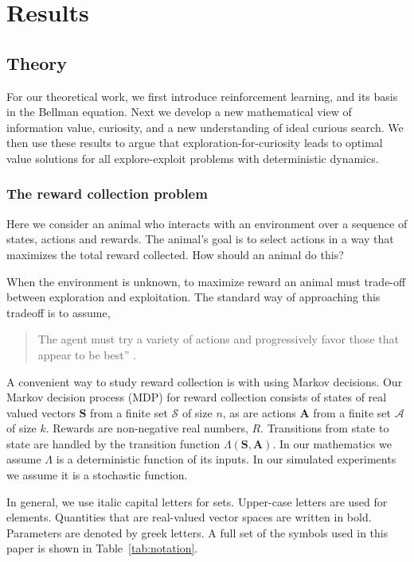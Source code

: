 \section*{Results} 
\subsection*{Theory}
For our theoretical work, we first introduce reinforcement learning, and its basis in the Bellman equation. Next we develop a new mathematical view of information value, curiosity, and a new understanding of ideal curious search. We then use these results to argue that exploration-for-curiosity leads to optimal value solutions for all explore-exploit problems with deterministic dynamics.

\subsubsection*{The reward collection problem}
Here we consider an animal who interacts with an environment over a sequence of states, actions and rewards. The animal's goal is to select actions in a way that maximizes the total reward collected. How should an animal do this? 

When the environment is unknown, to maximize reward an animal must trade-off between exploration and exploitation. The standard way of approaching this tradeoff is to assume, 

\begin{quote}
The agent must try a variety of actions and progressively favor those that appear to be best'' \cite{Sutton2018}. 
\end{quote}

A convenient way to study reward collection is with using Markov decisions.
Our Markov decision process (MDP) for reward collection consists of states of real valued vectors $\mathbf{S}$ from a finite set $\mathcal{S}$ of size $n$, as are actions $\mathbf{A}$ from a finite set $\mathcal{A}$ of size $k$. Rewards are non-negative real numbers, $R$. Transitions from state to state are handled by the transition function $\Lambda(\mathbf{S},\mathbf{A})$. In our mathematics we assume $\Lambda$ is a deterministic function of its inputs. In our simulated experiments we assume it is a stochastic function.

In general, we use italic capital letters for sets. Upper-case letters are used for elements. Quantities that are real-valued vector spaces are written in bold. Parameters are denoted by greek letters. A full set of the symbols used in this paper is shown in Table~\ref{tab:notation}.

